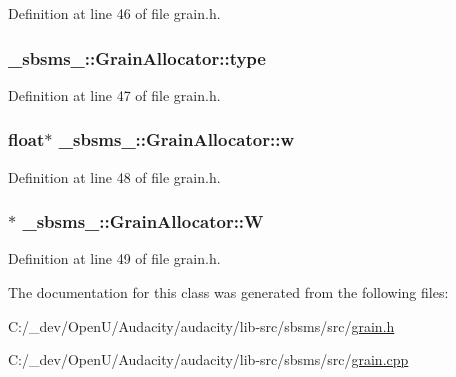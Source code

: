 Definition at line 46 of file grain.\+h.

\subsubsection[{\texorpdfstring{type}{type}}]{ \+\_\+sbsms\+\_\+\+::\+Grain\+Allocator\+::type\hspace{0.3cm}{\ttfamily [protected]}}\hypertarget{class__sbsms___1_1_grain_allocator_a5ac786aafdb92d5a78a929c6accf48d0}{}\label{class__sbsms___1_1_grain_allocator_a5ac786aafdb92d5a78a929c6accf48d0}


Definition at line 47 of file grain.\+h.

\subsubsection[{\texorpdfstring{w}{w}}]{\setlength{\rightskip}{0pt plus 5cm}float$\ast$ \+\_\+sbsms\+\_\+\+::\+Grain\+Allocator\+::w\hspace{0.3cm}{\ttfamily [protected]}}\hypertarget{class__sbsms___1_1_grain_allocator_a218c7900b8b9e679ae4dae3e0014ff96}{}\label{class__sbsms___1_1_grain_allocator_a218c7900b8b9e679ae4dae3e0014ff96}


Definition at line 48 of file grain.\+h.

\subsubsection[{\texorpdfstring{W}{W}}]{$\ast$ \+\_\+sbsms\+\_\+\+::\+Grain\+Allocator\+::W\hspace{0.3cm}{\ttfamily [protected]}}\hypertarget{class__sbsms___1_1_grain_allocator_a67ac7e262b165d86212d5b4bf4d2e1f4}{}\label{class__sbsms___1_1_grain_allocator_a67ac7e262b165d86212d5b4bf4d2e1f4}


Definition at line 49 of file grain.\+h.



The documentation for this class was generated from the following files\+:\begin{DoxyCompactItemize}
\item 
C\+:/\+\_\+dev/\+Open\+U/\+Audacity/audacity/lib-\/src/sbsms/src/\hyperlink{grain_8h}{grain.\+h}\item 
C\+:/\+\_\+dev/\+Open\+U/\+Audacity/audacity/lib-\/src/sbsms/src/\hyperlink{grain_8cpp}{grain.\+cpp}\end{DoxyCompactItemize}
